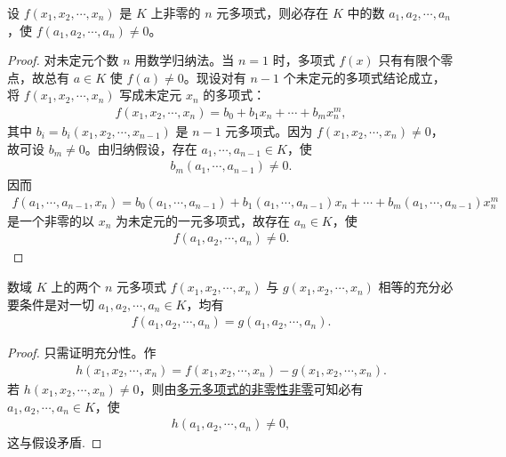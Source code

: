 \documentclass[../../main.tex]{subfiles}%
\begin{document}
\begin{lemma}[多元多项式的非零性]\label{lemma:多元多项式的非零性}
设 \(f(x_1,x_2,\cdots ,x_n)\) 是 \(K\) 上非零的 \(n\) 元多项式，则必存在 \(K\) 中的数 \(a_1,a_2,\cdots ,a_n\)，使 \(f(a_1,a_2,\cdots ,a_n) \ne 0\)。
\end{lemma}
\begin{proof}

对未定元个数 \(n\) 用数学归纳法。当 \(n=1\) 时，多项式 \(f(x)\) 只有有限个零点，故总有 \(a \in K\) 使 \(f(a) \ne 0\)。现设对有 \(n-1\) 个未定元的多项式结论成立，将 \(f(x_1,x_2,\cdots ,x_n)\) 写成未定元 \(x_n\) 的多项式：
\begin{align*}
f(x_1,x_2,\cdots ,x_n) = b_0 + b_1 x_n + \cdots + b_m x_n^m,
\end{align*}
其中 \(b_i = b_i(x_1,x_2,\cdots ,x_{n-1})\) 是 \(n-1\) 元多项式。因为 \(f(x_1,x_2,\cdots ,x_n) \ne 0\)，故可设 \(b_m \ne 0\)。由归纳假设，存在 \(a_1,\cdots ,a_{n-1} \in K\)，使
\begin{align*}
b_m(a_1,\cdots ,a_{n-1}) \ne 0.
\end{align*}
因而
\begin{align*}
f(a_1,\cdots ,a_{n-1},x_n) = b_0(a_1,\cdots ,a_{n-1}) + b_1(a_1,\cdots ,a_{n-1}) x_n + \cdots + b_m(a_1,\cdots ,a_{n-1}) x_n^m
\end{align*}
是一个非零的以 \(x_n\) 为未定元的一元多项式，故存在 \(a_n \in K\)，使
\begin{align*}
f(a_1,a_2,\cdots ,a_n) \ne 0.
\end{align*}

\end{proof}

\begin{proposition}[多元多项式相等的充要条件]\label{proposition:多元多项式相等的充要条件}
数域 \(K\) 上的两个 \(n\) 元多项式 \(f(x_1,x_2,\cdots ,x_n)\) 与 \(g(x_1,x_2,\cdots ,x_n)\) 相等的充分必要条件是对一切 \(a_1,a_2,\cdots ,a_n \in K\)，均有
\begin{align*}
f(a_1,a_2,\cdots ,a_n) = g(a_1,a_2,\cdots ,a_n).
\end{align*}
\end{proposition}
\begin{proof}

只需证明充分性。作
\begin{align*}
h(x_1,x_2,\cdots ,x_n) = f(x_1,x_2,\cdots ,x_n) - g(x_1,x_2,\cdots ,x_n).
\end{align*}
若 \(h(x_1,x_2,\cdots ,x_n) \ne 0\)，则由\hyperref[lemma:多元多项式的非零性]{多元多项式的非零性非零}可知必有 \(a_1,a_2,\cdots ,a_n \in K\)，使
\begin{align*}
h(a_1,a_2,\cdots ,a_n) \ne 0,
\end{align*}
这与假设矛盾.

\end{proof}
\end{document}
